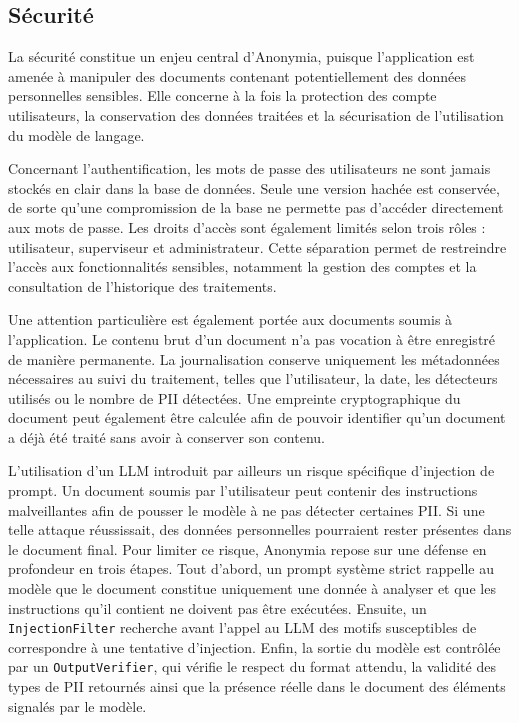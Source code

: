 \documentclass[12pt,a4paper]{article}
\begin{document}
\subsection{Sécurité}

La sécurité constitue un enjeu central d'Anonymia, puisque l'application est amenée à manipuler des documents contenant potentiellement des données personnelles sensibles. Elle concerne à la fois la protection des compte utilisateurs, la conservation des données traitées et la sécurisation de
l'utilisation du modèle de langage.

Concernant l'authentification, les mots de passe des utilisateurs ne sont jamais stockés en clair dans la base de données. Seule une version hachée est conservée, de sorte qu'une compromission de la base ne permette pas d'accéder directement aux mots de passe. Les droits d'accès sont également limités selon trois rôles :
utilisateur, superviseur et administrateur. Cette séparation permet de restreindre l'accès aux fonctionnalités sensibles, notamment la gestion des comptes et la consultation de l'historique des traitements.

Une attention particulière est également portée aux documents soumis à l'application. Le contenu brut d'un document n'a pas vocation à être enregistré de manière permanente. La journalisation conserve uniquement les métadonnées
nécessaires au suivi du traitement, telles que l'utilisateur, la date, les détecteurs utilisés ou le nombre de PII détectées. Une empreinte cryptographique du document peut également être calculée afin de pouvoir identifier qu'un document a déjà été traité sans avoir à conserver son contenu.

L'utilisation d'un LLM introduit par ailleurs un risque spécifique d'injection de prompt. Un document soumis par l'utilisateur peut contenir des instructions malveillantes afin de pousser le modèle à ne pas détecter certaines PII. Si une telle attaque réussissait, des données personnelles pourraient rester présentes dans le document final. Pour limiter ce risque, Anonymia repose sur une défense en profondeur en trois
étapes. Tout d'abord, un prompt système strict rappelle au modèle que le document constitue uniquement une donnée à analyser et que les instructions qu'il contient ne doivent pas être exécutées. Ensuite, un \texttt{InjectionFilter} recherche
avant l'appel au LLM des motifs susceptibles de correspondre à une tentative d'injection. Enfin, la sortie du modèle est contrôlée par un \texttt{OutputVerifier}, qui vérifie le respect du format attendu, la validité des types de PII retournés ainsi que la présence réelle dans le document des
éléments signalés par le modèle.
\end{document}
